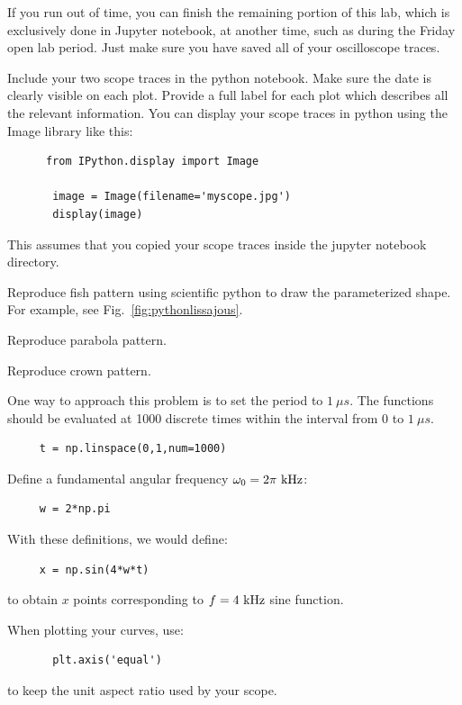 If you run out of time, you can finish the remaining portion of this
lab, which is exclusively done in Jupyter notebook, at another time,
such as during the Friday open lab period.  Just make sure you have
saved all of your oscilloscope traces.

Include your two scope traces in the python notebook. Make sure the
date is clearly visible on each plot. Provide a full label for each
plot which describes all the relevant information.  You can display
your scope traces in python using the Image library like this:

\begin{verbatim}
      from IPython.display import Image

       image = Image(filename='myscope.jpg') 
       display(image)
\end{verbatim}
This assumes that you copied your scope traces inside the jupyter notebook directory. 

\begin{plot} Reproduce fish pattern using scientific
python to draw the parameterized shape.  For
example, see Fig.~\ref{fig:pythonlissajous}. \end{plot}
\begin{plot} Reproduce  parabola pattern. \end{plot} 
\begin{plot} Reproduce crown pattern. \end{plot}

One way to approach this problem is to set the period to $1~\mu s$.
The functions should be evaluated at 1000 discrete times within the
interval from 0 to $1~\mu s$.
\begin{verbatim}
     t = np.linspace(0,1,num=1000)
\end{verbatim}
Define a fundamental angular frequency $\omega_0 = 2 \pi~\rm kHz$:
\begin{verbatim}
     w = 2*np.pi
\end{verbatim}
With these definitions, we would define:
\begin{verbatim}
     x = np.sin(4*w*t)
\end{verbatim}
to obtain $x$ points corresponding to $f=4~\rm kHz$ sine function.

When plotting your curves, use:
\begin{verbatim}
       plt.axis('equal')
\end{verbatim}
to keep the unit aspect ratio used by your scope.

